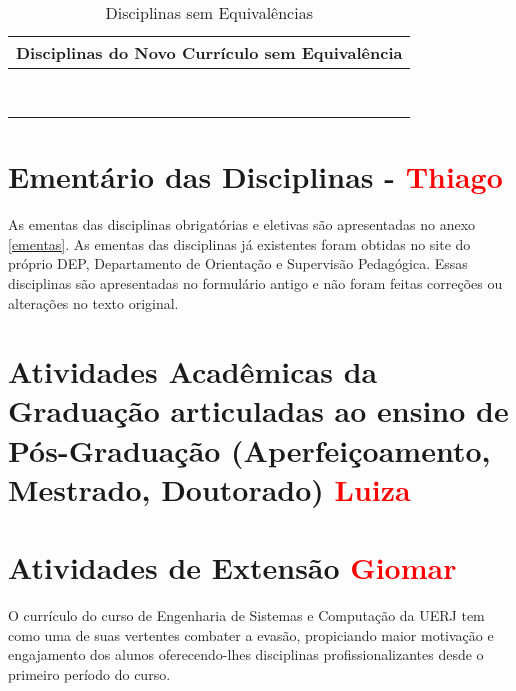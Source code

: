 \begin{table}
	\centering
	\renewcommand{\arraystretch}{1.5}
	\caption{Disciplinas sem Equivalências}
	\label{DiscSemEqui}
	\begin{tabularx}{\textwidth}{|X|}
		\hline
		{\textbf{Disciplinas do Novo Currículo sem Equivalência}} \\
		\hline
		\LogProg                                                  \\
		\IC                                                       \\
		\EngCompSoc                                               \\
		\MineraDados                                              \\
		\SistEmb                                                  \\
		\ProcImag                                                 \\
		\CompParal                                                \\
		\EstSup                                                   \\
		\hline
	\end{tabularx}
\end{table}

\section{Ementário das Disciplinas - \textcolor{red}{Thiago}}

As ementas das disciplinas obrigatórias e eletivas são apresentadas no anexo \ref{ementas}. As ementas das disciplinas já existentes foram obtidas no site do próprio DEP, Departamento de Orientação e Supervisão Pedagógica. Essas disciplinas são apresentadas no formulário antigo e não foram feitas correções ou alterações no texto original.

\section{Atividades Acadêmicas da Graduação articuladas ao ensino de Pós-Graduação (Aperfeiçoamento, Mestrado, Doutorado) \textcolor{red}{Luiza} }

\section{Atividades de Extensão \textcolor{red}{Giomar}}

O currículo do curso de Engenharia de Sistemas e Computação da UERJ tem como uma de suas vertentes combater a evasão, propiciando maior motivação e engajamento dos alunos oferecendo-lhes disciplinas profissionalizantes desde o primeiro período do curso. 

